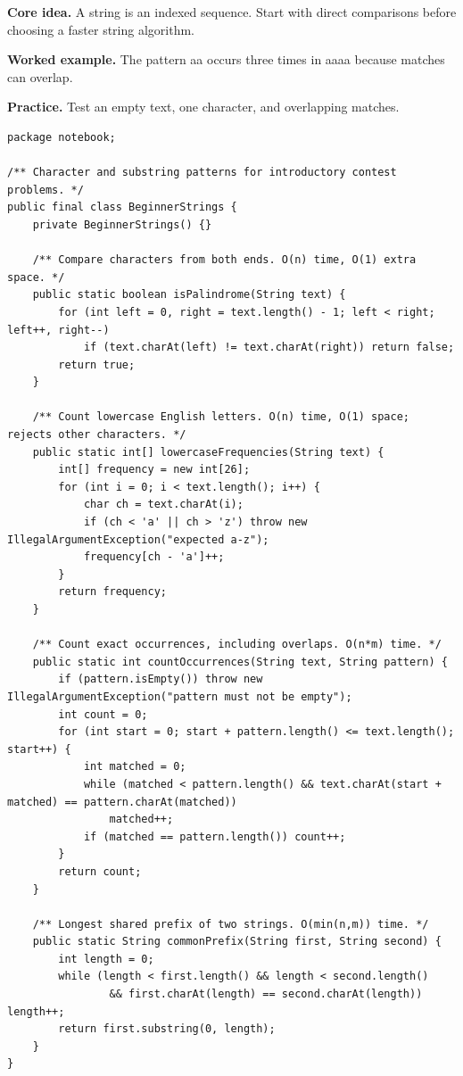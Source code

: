 \documentclass[10pt,letterpaper]{article}
\begin{document}
\noindent\textbf{Core idea.} A string is an indexed sequence. Start with direct comparisons before choosing a faster string algorithm.\par
\noindent\textbf{Worked example.} The pattern aa occurs three times in aaaa because matches can overlap.\par
\noindent\textbf{Practice.} Test an empty text, one character, and overlapping matches.\par
\begin{lstlisting}
package notebook;

/** Character and substring patterns for introductory contest problems. */
public final class BeginnerStrings {
    private BeginnerStrings() {}

    /** Compare characters from both ends. O(n) time, O(1) extra space. */
    public static boolean isPalindrome(String text) {
        for (int left = 0, right = text.length() - 1; left < right; left++, right--)
            if (text.charAt(left) != text.charAt(right)) return false;
        return true;
    }

    /** Count lowercase English letters. O(n) time, O(1) space; rejects other characters. */
    public static int[] lowercaseFrequencies(String text) {
        int[] frequency = new int[26];
        for (int i = 0; i < text.length(); i++) {
            char ch = text.charAt(i);
            if (ch < 'a' || ch > 'z') throw new IllegalArgumentException("expected a-z");
            frequency[ch - 'a']++;
        }
        return frequency;
    }

    /** Count exact occurrences, including overlaps. O(n*m) time. */
    public static int countOccurrences(String text, String pattern) {
        if (pattern.isEmpty()) throw new IllegalArgumentException("pattern must not be empty");
        int count = 0;
        for (int start = 0; start + pattern.length() <= text.length(); start++) {
            int matched = 0;
            while (matched < pattern.length() && text.charAt(start + matched) == pattern.charAt(matched))
                matched++;
            if (matched == pattern.length()) count++;
        }
        return count;
    }

    /** Longest shared prefix of two strings. O(min(n,m)) time. */
    public static String commonPrefix(String first, String second) {
        int length = 0;
        while (length < first.length() && length < second.length()
                && first.charAt(length) == second.charAt(length)) length++;
        return first.substring(0, length);
    }
}
\end{lstlisting}
\end{document}
